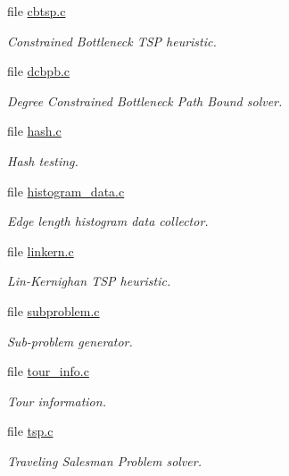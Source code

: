 \begin{CompactItemize}
\item 
file \hyperlink{cbtsp_8c}{cbtsp.c}
\begin{CompactList}\small\item\em Constrained Bottleneck TSP heuristic. \item\end{CompactList}

\item 
file \hyperlink{bin_2dcbpb_8c}{dcbpb.c}
\begin{CompactList}\small\item\em Degree Constrained Bottleneck Path Bound solver. \item\end{CompactList}

\item 
file \hyperlink{hash_8c}{hash.c}
\begin{CompactList}\small\item\em Hash testing. \item\end{CompactList}

\item 
file \hyperlink{histogram__data_8c}{histogram\_\-data.c}
\begin{CompactList}\small\item\em Edge length histogram data collector. \item\end{CompactList}

\item 
file \hyperlink{linkern_8c}{linkern.c}
\begin{CompactList}\small\item\em Lin-Kernighan TSP heuristic. \item\end{CompactList}

\item 
file \hyperlink{subproblem_8c}{subproblem.c}
\begin{CompactList}\small\item\em Sub-problem generator. \item\end{CompactList}

\item 
file \hyperlink{tour__info_8c}{tour\_\-info.c}
\begin{CompactList}\small\item\em Tour information. \item\end{CompactList}

\item 
file \hyperlink{bin_2tsp_8c}{tsp.c}
\begin{CompactList}\small\item\em Traveling Salesman Problem solver. \item\end{CompactList}

\end{CompactItemize}
